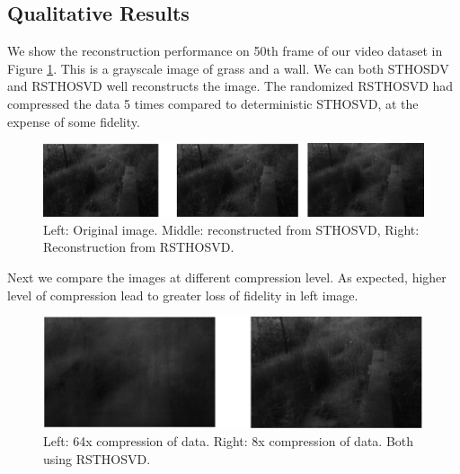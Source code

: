 \documentclass[preprint]{elsarticle}
\begin{document}
\subsection{Qualitative Results}
\noindent We show the reconstruction performance on 50th frame of our video dataset in Figure
\ref{fig:alg_compare}. This is a grayscale image of grass and a wall. We can both STHOSDV and RSTHOSVD
well reconstructs the image. The randomized RSTHOSVD had compressed the data 5 times compared to deterministic
STHOSVD, at the expense of some fidelity.

\begin{figure}[H]
    \centering
    \includegraphics[width=\textwidth]{figs/osr.png}
    \caption{Left: Original image. Middle: reconstructed from STHOSVD, Right: Reconstruction from RSTHOSVD.}
    \label{fig:alg_compare}
\end{figure}

\noindent Next we compare the images at different compression level. As expected, higher level of compression
lead to greater loss of fidelity in left image.

\begin{figure}[H]
    \centering
    \includegraphics[width=\textwidth]{figs/648.png}
    \caption{Left: 64x compression of data. Right: 8x compression of data. Both using RSTHOSVD.}
    \label{fig:compression_compare}
\end{figure}
\end{document}
